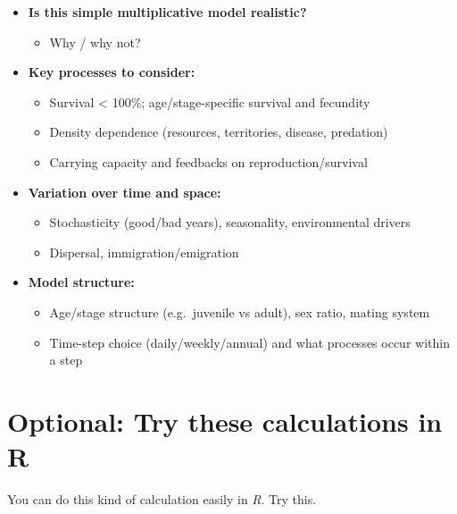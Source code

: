 \documentclass[
  a4paper]{book}
\providecommand{\tightlist}{%
  \setlength{\itemsep}{0pt}\setlength{\parskip}{0pt}}
\begin{document}
\begin{itemize}
\tightlist
\item
  \textbf{Is this simple multiplicative model realistic?}

  \begin{itemize}
  \tightlist
  \item
    Why / why not?
  \end{itemize}
\item
  \textbf{Key processes to consider:}

  \begin{itemize}
  \tightlist
  \item
    Survival \textless{} 100\%; age/stage-specific survival and fecundity
  \item
    Density dependence (resources, territories, disease, predation)
  \item
    Carrying capacity and feedbacks on reproduction/survival
  \end{itemize}
\item
  \textbf{Variation over time and space:}

  \begin{itemize}
  \tightlist
  \item
    Stochasticity (good/bad years), seasonality, environmental drivers
  \item
    Dispersal, immigration/emigration
  \end{itemize}
\item
  \textbf{Model structure:}

  \begin{itemize}
  \tightlist
  \item
    Age/stage structure (e.g.~juvenile vs adult), sex ratio, mating system
  \item
    Time-step choice (daily/weekly/annual) and what processes occur within a step
  \end{itemize}
\end{itemize}

\section{Optional: Try these calculations in R}\label{optional-try-these-calculations-in-r}

You can do this kind of calculation easily in \emph{R}. Try this.
\end{document}
